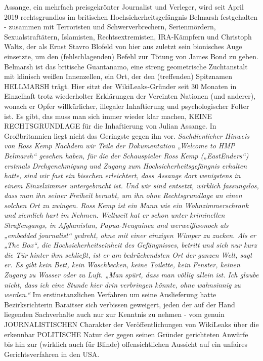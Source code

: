 \begin{multicols}{2}
{\textCR
Assange, ein mehrfach preisgekrönter Journalist und
Verleger, wird seit April 2019 rechtsgrundlos im britischen Hochsicherheitsgefängnis Belmarsh festgehalten
- zusammen mit Terroristen und Schwerverbrechern,
Serienmördern, Sexualstraftätern, Islamisten, Rechtsextremisten, IRA-Kämpfern und Christoph Waltz, der
als Ernst Stavro Blofeld von hier aus zuletzt sein bionisches Auge einsetzte, um den (fehlschlagenden) Befehl
zur Tötung von James Bond zu geben. Belmarsh ist das
britische Guantanamo, eine streng geometrische Zuchtanstalt mit klinisch weißen Innenzellen, ein Ort, der den
(treffenden) Spitznamen HELLMARSH trägt. Hier sitzt
der WikiLeaks-Gründer seit 30 Monaten in Einzelhaft trotz wiederholter Erklärungen der Vereinten Nationen
(und anderer), wonach er Opfer willkürlicher, illegaler Inhaftierung und psychologischer Folter ist. Es gibt,
das muss man sich immer wieder klar machen, KEINE
RECHTSGRUNDLAGE für die Inhaftierung von Julian
Assange. In Großbritannien liegt nicht das Geringste
gegen ihn vor.
\textCR
\textit{Sachdienlicher Hinweis von Ross Kemp
Nachdem wir Teile der Dokumentation „Welcome to
HMP Belmarsh“ gesehen haben, für die der Schauspieler
Ross Kemp („EastEnders“) erstmals Drehgenehmigung
und Zugang zum Hochsicherheitsgefängnis erhalten hatte, sind wir fast ein bisschen erleichtert, dass Assange dort
wenigstens in einem Einzelzimmer untergebracht ist.
Und wir sind entsetzt, wirklich fassungslos, dass man ihn
seiner Freiheit beraubt, um ihn ohne Rechtsgrundlage an
einen solchen Ort zu zwingen. Ross Kemp ist ein Mann wie
ein Wohnzimmerschrank und ziemlich hart im Nehmen.
Weltweit hat er schon unter kriminellen Straßengangs, in
Afghanistan, Papua-Neuguinea und werweißwonoch als
„embedded journalist“ gedreht, ohne mit einer einzigen
Wimper zu zucken. Als er „The Box“, die Hochsicherheitseinheit des Gefängnisses, betritt und sich nur kurz die
Tür hinter ihm schließt, ist er am bedrückendsten Ort der
ganzen Welt, sagt er. Es gibt kein Bett, kein Waschbecken,
keine Toilette, kein Fenster, keinen Zugang zu Wasser oder
zu Luft. „Man spürt, dass man völlig allein ist. Ich glaube
nicht, dass ich eine Stunde hier drin verbringen könnte,
ohne wahnsinnig zu werden.“}
\textCR
Im erstinstanzlichen Verfahren um seine Auslieferung
hatte Bezirksrichterin Baraitser sich verbissen geweigert,
jeden der auf der Hand liegenden Sachverhalte auch nur
zur Kenntnis zu nehmen - vom genuin JOURNALISTISCHEN Charakter der Veröffentlichungen von WikiLeaks
über die erkennbar POLITISCHE Natur der gegen seinen
Gründer gerichteten Anwürfe bis hin zur (wirklich auch für Blinde) offensichtlichen Aussicht auf ein unfaires Gerichtsverfahren in den USA.
}
\end{multicols}
